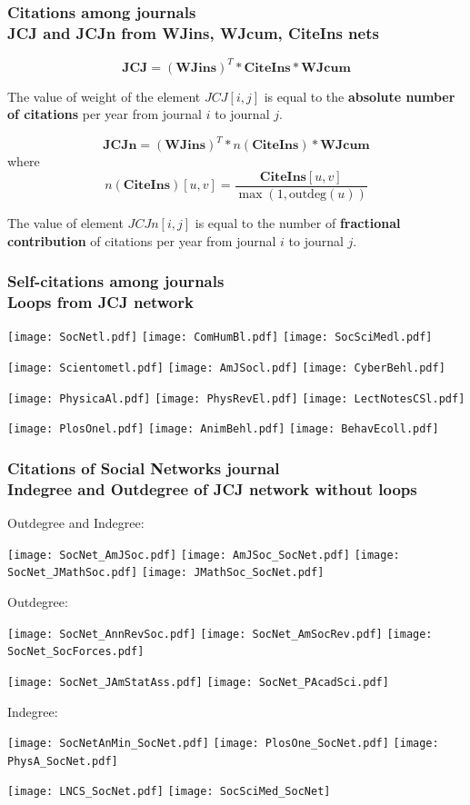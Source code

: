 \documentclass[hyperref={pdfstartview={FitBH -32768},
                         pdfpagemode=FullScreen,
                         plainpages=false,
                         colorlinks=true}
              ]{beamer}
\begin{document}
\begin{frame}[fragile]
\frametitle{Citations among journals \\ \normalsize JCJ and JCJn from WJins, WJcum, CiteIns nets} 

\[ \mathbf{JCJ} = (\mathbf{WJins}) ^ T * \mathbf{CiteIns} * \mathbf{WJcum} \]  

The value of weight of the element $JCJ[i,j]$ is equal to the \textbf{absolute number of citations} per year from journal $i$ to journal $j$. \smallskip

\[ \mathbf{JCJn} = (\mathbf{WJins}) ^ T * n(\mathbf{CiteIns}) * \mathbf{WJcum} \]  
where 
\[ n(\mathbf{CiteIns})[u,v] = \frac {\mathbf{CiteIns}[u,v]}{\max(1,\textrm{outdeg}(u))}\]

The value of element $JCJn[i,j]$ is equal to the number of \textbf{fractional contribution} of citations per year from journal $i$ to journal $j$. \smallskip

\end{frame}    

\begin{frame}[fragile]
\frametitle{Self-citations among journals \\ \normalsize Loops from JCJ network} 
\centerline{
\texttt{[image: SocNetl.pdf]} 
\texttt{[image: ComHumBl.pdf]}
\texttt{[image: SocSciMedl.pdf]}} 
\centerline{
\texttt{[image: Scientometl.pdf]}
\texttt{[image: AmJSocl.pdf]}
\texttt{[image: CyberBehl.pdf]}} 
\centerline{
\texttt{[image: PhysicaAl.pdf]} 
\texttt{[image: PhysRevEl.pdf]}
\texttt{[image: LectNotesCSl.pdf]}} 
\centerline{
\texttt{[image: PlosOnel.pdf]}
\texttt{[image: AnimBehl.pdf]} 
\texttt{[image: BehavEcoll.pdf]}}
\end{frame}   


\begin{frame}[fragile]
\frametitle{Citations of Social Networks journal \\ \normalsize Indegree and Outdegree of JCJ network without loops} 

Outdegree and Indegree: 
\centerline{
\texttt{[image: SocNet\_AmJSoc.pdf]} 
\texttt{[image: AmJSoc\_SocNet.pdf]} 
\texttt{[image: SocNet\_JMathSoc.pdf]}
\texttt{[image: JMathSoc\_SocNet.pdf]}} \medskip 
Outdegree: 
\centerline{ 
\texttt{[image: SocNet\_AnnRevSoc.pdf]} 
\texttt{[image: SocNet\_AmSocRev.pdf]}
\texttt{[image: SocNet\_SocForces.pdf]}} 
\centerline{  
\texttt{[image: SocNet\_JAmStatAss.pdf]}
\texttt{[image: SocNet\_PAcadSci.pdf]}} \medskip  
Indegree:
\centerline{
\texttt{[image: SocNetAnMin\_SocNet.pdf]}
\texttt{[image: PlosOne\_SocNet.pdf]} 
\texttt{[image: PhysA\_SocNet.pdf]}} 
\centerline{
\texttt{[image: LNCS\_SocNet.pdf]} 
\texttt{[image: SocSciMed\_SocNet]}} 
\end{frame}  
 
\end{document}
